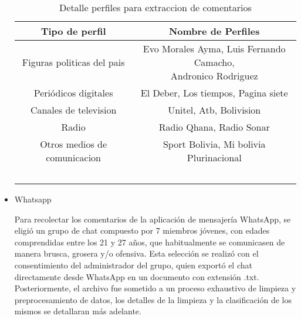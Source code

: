 \begin{itemize}
\begin{table}[!ht]
	\centering
	\begin{tabular}{|c|c|}
		\hline
		\textbf{Tipo de perfil} & \textbf{Nombre de Perfiles} \\ \hline
		Figuras politicas del pais  & \makecell{Evo Morales Ayma, Luis Fernando Camacho, \\  Andronico Rodriguez} \\ \hline
		Periódicos digitales                       & El Deber, Los tiempos, Pagina siete \\ \hline
		Canales de television & Unitel, Atb, Bolivision \\ \hline
		Radio  & Radio Qhana, Radio Sonar \\ \hline
		Otros medios de comunicacion & Sport Bolivia, Mi bolivia Plurinacional \\ \hline
		~ & ~ \\ \hline
	\end{tabular}
	\caption{Detalle perfiles para extraccion de comentarios}
	\label{tbl:16}
\end{table}

\item{Whatsapp}


Para recolectar los comentarios de la aplicación de mensajería WhatsApp, se eligió un grupo de chat compuesto por 7 miembros jóvenes, con edades comprendidas entre los 21 y 27 años, que habitualmente se comunicasen de manera brusca, grosera y/o ofensiva. Esta selección se realizó con el consentimiento del administrador del grupo, quien exportó el chat directamente desde WhatsApp en un documento con extensión .txt. Posteriormente, el archivo fue sometido a un proceso exhaustivo de limpieza y preprocesamiento de datos, los detalles de la limpieza y la clasificación de los mismos se detallaran más  adelante.

\end{itemize}




